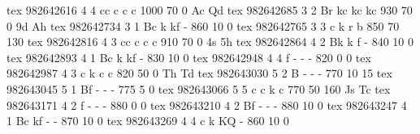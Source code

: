 tex       982642616  4  4 cc  c     c     c         1000   70    0 Ac Qd
tex       982642685  3  2 Br  kc    kc    kc         930   70    0 9d Ah
tex       982642734  3  1 Bc  k     kf    -          860   10    0 
tex       982642765  3  3 c   k     r     b          850   70  130 
tex       982642816  4  3 cc  c     c     c          910   70    0 4s 5h
tex       982642864  4  2 Bk  k     f     -          840   10    0 
tex       982642893  4  1 Bc  k     kf    -          830   10    0 
tex       982642948  4  4 f   -     -     -          820    0    0 
tex       982642987  4  3 c   k     c     c          820   50    0 Th Td
tex       982643030  5  2 B   -     -     -          770   10   15 
tex       982643045  5  1 Bf  -     -     -          775    5    0 
tex       982643066  5  5 c   c     k     c          770   50  160 Js Tc
tex       982643171  4  2 f   -     -     -          880    0    0 
tex       982643210  4  2 Bf  -     -     -          880   10    0 
tex       982643247  4  1 Bc  kf    -     -          870   10    0 
tex       982643269  4  4 c   k     KQ    -          860   10    0 
